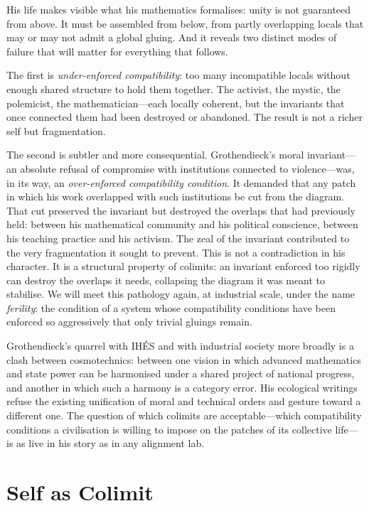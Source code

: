 His life makes visible what his mathematics formalises: unity is not guaranteed from above. It must be assembled from below, from partly overlapping locals that may or may not admit a global gluing. And it reveals two distinct modes of failure that will matter for everything that follows.

The first is \emph{under-enforced compatibility}: too many incompatible locals without enough shared structure to hold them together. The activist, the mystic, the polemicist, the mathematician---each locally coherent, but the invariants that once connected them had been destroyed or abandoned. The result is not a richer self but fragmentation.

The second is subtler and more consequential. Grothendieck's moral invariant---an absolute refusal of compromise with institutions connected to violence---was, in its way, an \emph{over-enforced compatibility condition}. It demanded that any patch in which his work overlapped with such institutions be cut from the diagram. That cut preserved the invariant but destroyed the overlaps that had previously held: between his mathematical community and his political conscience, between his teaching practice and his activism. The zeal of the invariant contributed to the very fragmentation it sought to prevent. This is not a contradiction in his character. It is a structural property of colimits: an invariant enforced too rigidly can destroy the overlaps it needs, collapsing the diagram it was meant to stabilise. We will meet this pathology again, at industrial scale, under the name \emph{ferility}: the condition of a system whose compatibility conditions have been enforced so aggressively that only trivial gluings remain.

Grothendieck's quarrel with IH\'{E}S and with industrial society more broadly is a clash between cosmotechnics: between one vision in which advanced mathematics and state power can be harmonised under a shared project of national progress, and another in which such a harmony is a category error. His ecological writings refuse the existing unification of moral and technical orders and gesture toward a different one. The question of which colimits are acceptable---which compatibility conditions a civilisation is willing to impose on the patches of its collective life---is as live in his story as in any alignment lab.


\section{Self as Colimit}

